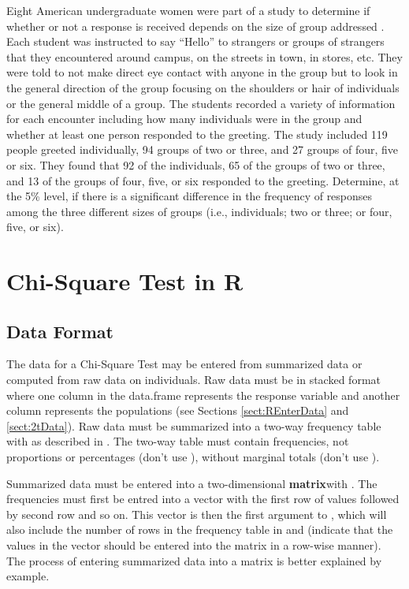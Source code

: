 \documentclass[10pt,openany]{book}\usepackage[]{graphicx}\usepackage[]{color}
\begin{document}
\begin{exsection}
  \item \label{revex:ChiGreeting} Eight American undergraduate women were part of a study to determine if whether or not a response is received depends on the size of group addressed \citep{JonesFoshay1984}.  Each student was instructed to say ``Hello'' to strangers or groups of strangers that they encountered around campus, on the streets in town, in stores, etc.  They were told to not make direct eye contact with anyone in the group but to look in the general direction of the group focusing on the shoulders or hair of individuals or the general middle of a group.  The students recorded a variety of information for each encounter including how many individuals were in the group and whether at least one person responded to the greeting.  The study included 119 people greeted individually, 94 groups of two or three, and 27 groups of four, five or six.  They found that 92 of the individuals, 65 of the groups of two or three, and 13 of the groups of four, five, or six responded to the greeting.  Determine, at the 5\% level, if there is a significant difference in the frequency of responses among the three different sizes of groups (i.e., individuals; two or three; or four, five, or six). 
\end{exsection}


\section{Chi-Square Test in R}
\vspace{-12pt}
\subsection{Data Format}
\vspace{-12pt}
The data for a Chi-Square Test may be entered from summarized data or computed from raw data on individuals.  Raw data must be in stacked format where one column in the data.frame represents the response variable and another column represents the populations (see Sections \ref{sect:REnterData} and \ref{sect:2tData}). Raw data must be summarized into a two-way frequency table with  as described in .  The two-way table must contain frequencies, not proportions or percentages (don't use ), without marginal totals (don't use ).

Summarized data must be entered into a two-dimensional \textbf{matrix}with .  The frequencies must first be entred into a vector with the first row of values followed by second row and so on.  This vector is then the first argument to , which will also include the number of rows in the frequency table in  and  (indicate that the values in the vector should be entered into the matrix in a row-wise manner). The process of entering summarized data into a matrix is better explained by example.
\end{document}
